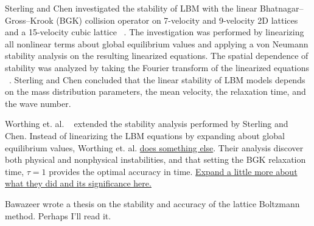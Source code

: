 \documentclass{article}
\begin{document}
Sterling and Chen investigated the stability of LBM with the linear Bhatnagar--Gross--Krook (BGK) collision operator on 7-velocity and 9-velocity 2D lattices and a 15-velocity cubic lattice ~\cite{sterling1993stability,sterling1996stability}.
The investigation was performed by linearizing all nonlinear terms about global equilibrium values and applying a von Neumann stability analysis on the resulting linearized equations.
The spatial dependence of stability was analyzed by taking the Fourier transform of the linearized equations ~\cite{sterling1993stability}.
Sterling and Chen concluded that the linear stability of LBM models depends on the mass distribution parameters, the mean velocity, the relaxation time, and the wave number. %

Worthing et. al. ~\cite{worthing1997stability} extended the stability analysis performed by Sterling and Chen.
Instead of linearizing the LBM equations by expanding about global equilibrium values, Worthing et. al. \ul{does something else}.
Their analysis discover both physical and nonphysical instabilities, and that setting the BGK relaxation time, $\tau = 1$ provides the optimal accuracy in time. %
\ul{Expand a little more about what they did and its significance here.}

{\color{red} Bawazeer wrote a thesis on the stability and accuracy of the lattice Boltzmann method. Perhaps I'll read it.}
\end{document}
